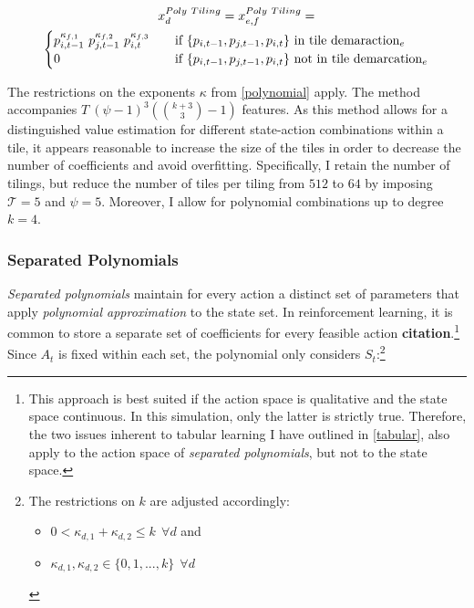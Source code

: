 \begin{gather}\label{poly_tiling_extraction}
x_d^{Poly~Tiling} = x_{e,f}^{Poly~Tiling} = \notag \\
\begin{cases}
p_{i, t-1}^{\kappa_{f,1}} ~ p_{j, t-1}^{\kappa_{f,2}} ~ p_{i, t}^{\kappa_{f,3}} & \quad \text{if } \{p_{i, t-1}, p_{j, t-1}, p_{i, t}\} \text{~in tile demaraction}_e  \\
0 & \quad \text{if } \{p_{i, t-1}, p_{j, t-1}, p_{i, t}\} \text{~not in tile demarcation}_e \\ \end{cases} 
\end{gather}

The restrictions on the exponents $\kappa$ from \autoref{polynomial} apply. The method accompanies $T~(\psi - 1)^3 ({k + 3\choose3}  - 1)$ features. As this method allows for a distinguished value estimation for different state-action combinations within a tile, it appears reasonable to increase the size of the tiles in order to decrease the number of coefficients and avoid overfitting. Specifically, I retain the number of tilings, but reduce the number of tiles per tiling from $512$ to $64$ by imposing $\mathcal{T} = 5$ and $\psi = 5$. Moreover, I allow for polynomial combinations up to degree $k=4$.

\subsubsection{Separated Polynomials}

\emph{Separated polynomials} maintain for every action a distinct set of parameters that apply \emph{polynomial approximation} to the state set. In reinforcement learning, it is common to store a separate set of coefficients for every feasible action \textbf{citation}.\footnote{This approach is best suited if the action space is qualitative and the state space continuous. In this simulation, only the latter is strictly true. Therefore, the two issues inherent to tabular learning I have outlined in \autoref{tabular}, also apply to the action space of \emph{separated polynomials}, but not to the state space.} Since $A_t$ is fixed within each set, the polynomial only considers $S_t$:\footnote{The restrictions on $k$ are adjusted accordingly:
	\begin{itemize}
		\item $0 < \kappa_{d,1} + \kappa_{d,2}  \leq k  ~~ \forall d$ and
		\item $\kappa_{d,1}, \kappa_{d,2} \in \{0, 1, ..., k\} ~~  \forall d$
	\end{itemize}
}



